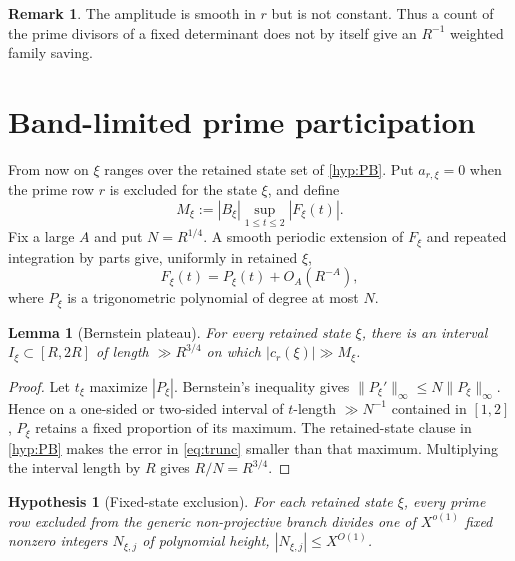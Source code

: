 \documentclass[11pt]{article}
\newtheorem{lemma}[lemma]{Lemma}
\newtheorem{hypothesis}[hypothesis]{Hypothesis}
\theoremstyle{definition}
\newtheorem{remark}[remark]{Remark}
\newcommand{\1}{\mathbf 1}
\begin{document}
\begin{remark}
The amplitude is smooth in $r$ but is not constant.  Thus a count of the prime
divisors of a fixed determinant does not by itself give an $R^{-1}$ weighted
family saving.
\end{remark}

\section{Band-limited prime participation}
\label{sec:bpp}
From now on $\xi$ ranges over the retained state set of \cref{hyp:PB}.  Put
$a_{r,\xi}=0$ when the prime row $r$ is excluded for the state $\xi$, and define
\[
   M_{\xi}:=|B_{\xi}|\sup_{1\le t\le2}|F_{\xi}(t)|.
\]
Fix a large $A$ and put $N=R^{1/4}$.  A smooth periodic extension of $F_{\xi}$
and repeated integration by parts give, uniformly in retained $\xi$,
\begin{equation}
   F_{\xi}(t)=P_{\xi}(t)+O_A(R^{-A}),
   \label{eq:trunc}
\end{equation}
where $P_{\xi}$ is a trigonometric polynomial of degree at most $N$.

\begin{lemma}[Bernstein plateau]
\label{lem:bernstein-plateau}
For every retained state $\xi$, there is an interval $I_{\xi}\subset[R,2R]$ of
length $\gg R^{3/4}$ on which $|c_r(\xi)|\gg M_{\xi}$.
\end{lemma}
\begin{proof}
Let $t_{\xi}$ maximize $|P_{\xi}|$.  Bernstein's inequality
\cite{Zygmund2002} gives
$\|P_{\xi}'\|_\infty\le N\|P_{\xi}\|_\infty$.  Hence on a one-sided or two-sided
interval of $t$-length $\gg N^{-1}$ contained in $[1,2]$, $P_{\xi}$ retains a
fixed proportion of its maximum.  The retained-state clause in
\cref{hyp:PB} makes the error in \eqref{eq:trunc} smaller than that maximum.
Multiplying the interval length by $R$ gives $R/N=R^{3/4}$.
\end{proof}

\begin{hypothesis}[Fixed-state exclusion]
\label{hyp:fixed-state-exclusion}
For each retained state $\xi$, every prime row excluded from the generic
non-projective branch divides one of $X^{o(1)}$ fixed nonzero integers
$N_{\xi,j}$ of polynomial height, $|N_{\xi,j}|\le X^{O(1)}$.
\end{hypothesis}
\end{document}
